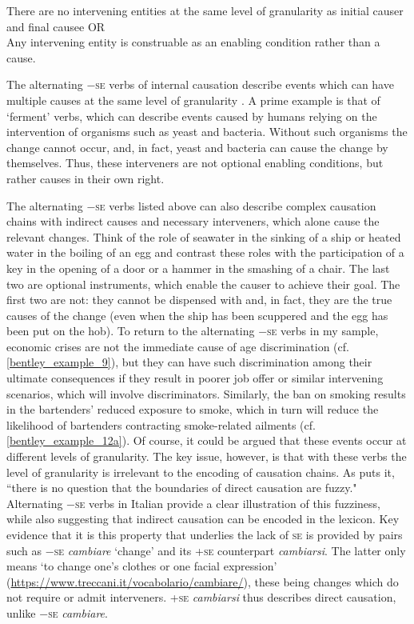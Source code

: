 \documentclass[output=paper,colorlinks,citecolor=brown
]{langscibook}
\begin{document}
\ea \label{bentley_example_13}
    \ea \label{bentley_example_13a}
    \glt There are no intervening entities at the same level of granularity as initial causer and final causee 	OR  \\
    \ex \label{bentley_example_13b}
    \glt Any intervening entity is construable as an enabling condition rather than a cause.  \\
    \z
\z

The alternating −\textsc{se} verbs of internal causation describe events which can have multiple causes at the same level of granularity \citep{bentley2023internally}. A prime example is that of ‘ferment’ verbs, which can describe events caused by humans relying on the intervention of organisms such as yeast and bacteria. Without such organisms the change cannot occur, and, in fact, yeast and bacteria can cause the change by themselves. Thus, these interveners are not optional enabling conditions, but rather causes in their own right. 

The alternating −\textsc{se} verbs listed above can also describe complex causation chains with indirect causes and necessary interveners, which alone cause the relevant changes. Think of the role of seawater in the sinking of a ship or heated water in the boiling of an egg and contrast these roles with the participation of a key in the opening of a door or a hammer in the smashing of a chair. The last two are optional instruments, which enable the causer to achieve their goal. The first two are not: they cannot be dispensed with and, in fact, they are the true causes of the change (even when the ship has been scuppered and the egg has been put on the hob). To return to the alternating −\textsc{se} verbs in my sample, economic crises are not the immediate cause of age discrimination (cf. \ref{bentley_example_9}), but they can have such discrimination among their ultimate consequences if they result in poorer job offer or similar intervening scenarios, which will involve discriminators. Similarly, the ban on smoking results in the bartenders’ reduced exposure to smoke, which in turn will reduce the likelihood of bartenders contracting smoke-related ailments (cf. \ref{bentley_example_12a}). Of course, it could be argued that these events occur at different levels of granularity. The key issue, however, is that with these verbs the level of granularity is irrelevant to the encoding of causation chains. As \citet[477]{kiparsky1997remarks} puts it, “there is no question that the boundaries of direct causation are fuzzy." Alternating −\textsc{se} verbs in Italian provide a clear illustration of this fuzziness, while also suggesting that indirect causation can be encoded in the lexicon. Key evidence that it is this property that underlies the lack of \textsc{se} is provided by pairs such as −\textsc{se} \textit{cambiare} ‘change’ and its +\textsc{se} counterpart \textit{cambiarsi}. The latter only means ‘to change one’s clothes or one facial expression’ (\url{https://www.treccani.it/vocabolario/cambiare/}), these being changes which do not require or admit interveners. +\textsc{se} \textit{cambiarsi} thus describes direct causation, unlike −\textsc{se} \textit{cambiare}. 
\end{document}
